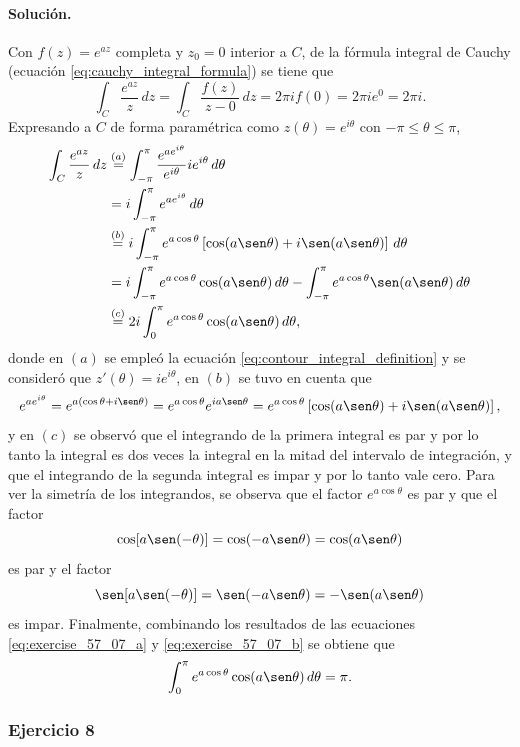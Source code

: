 \documentclass[a4paper]{report}
\begin{document}
\paragraph{Solución.} Con \(f(z)=e^{az}\) completa y \(z_0=0\) interior a \(C\), de la fórmula integral de Cauchy (ecuación \ref{eq:cauchy_integral_formula}) se tiene que 
\begin{equation}\label{eq:exercise_57_07_a}
 \int_C\frac{e^{az}}{z}\,dz=\int_C\frac{f(z)}{z-0}\,dz=2\pi if(0)=2\pi ie^0=2\pi i. 
\end{equation}
Expresando a \(C\) de forma paramétrica como \(z(\theta)=e^{i\theta}\) con \(-\pi\leq\theta\leq\pi\),
\begin{align}
 \int_C\frac{e^{az}}{z}\,dz&\overset{(a)}{=}\int_{-\pi}^\pi\frac{e^{ae^{i\theta}}}{e^{i\theta}}ie^{i\theta}\,d\theta\nonumber\\
  &=i\int_{-\pi}^\pi e^{ae^{i\theta}}\,d\theta\nonumber\\
  &\overset{(b)}{=}i\int_{-\pi}^\pi e^{a\cos\theta}\left[\cos(a\sen\theta)+i\sen(a\sen\theta)\right]\,d\theta\nonumber\\
  &=i\int_{-\pi}^\pi e^{a\cos\theta}\cos(a\sen\theta)\,d\theta-\int_{-\pi}^\pi e^{a\cos\theta}\sen(a\sen\theta)\,d\theta\nonumber\\
  &\overset{(c)}{=}2i\int_{0}^\pi e^{a\cos\theta}\cos(a\sen\theta)\,d\theta,\label{eq:exercise_57_07_b}
\end{align}
donde en \((a)\) se empleó la ecuación \ref{eq:contour_integral_definition} y se consideró que \(z'(\theta)=ie^{i\theta}\), en \((b)\) se tuvo en cuenta que 
\[
 e^{ae^{i\theta}}=e^{a(\cos\theta+i\sen\theta)}=e^{a\cos\theta}e^{ia\sen\theta}=
 e^{a\cos\theta}\left[\cos(a\sen\theta)+i\sen(a\sen\theta)\right],
\]
y en \((c)\) se observó que el integrando de la primera integral es par y por lo tanto la integral es dos veces la integral en la mitad del intervalo de integración, y que el integrando de la segunda integral es impar y por lo tanto vale cero. Para ver la simetría de los integrandos, se observa que el factor \(e^{a\cos\theta}\) es par y que el factor
\[
 \cos[a\sen(-\theta)]=\cos(-a\sen\theta)=\cos(a\sen\theta)
\]
es par y el factor 
\[
 \sen[a\sen(-\theta)]=\sen(-a\sen\theta)=-\sen(a\sen\theta)
\]
es impar. Finalmente, combinando los resultados de las ecuaciones \ref{eq:exercise_57_07_a} y \ref{eq:exercise_57_07_b} se obtiene que 
\[
 \int_{0}^\pi e^{a\cos\theta}\cos(a\sen\theta)\,d\theta=\pi.
\]

\subsubsection*{Ejercicio 8}
\end{document}
